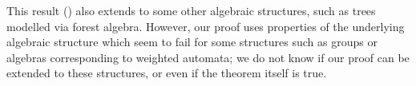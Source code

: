 This result () also extends to some other algebraic structures, such as trees modelled via forest algebra. However, our proof uses properties of the underlying algebraic structure which seem to fail for some structures such as groups or algebras corresponding to weighted automata; we do not know if our proof can be extended to  these structures, or even if the theorem itself is true.

